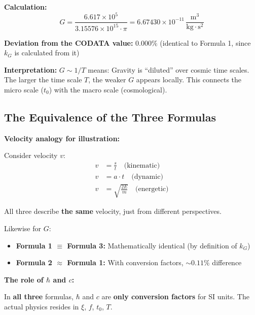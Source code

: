 	\textbf{Calculation:}
	\begin{equation}
		G = \frac{6.617 \times 10^5}{3.15576 \times 10^{15} \cdot \pi} = 6.67430 \times 10^{-11}\,\frac{\text{m}^3}{\text{kg} \cdot \text{s}^2}
	\end{equation}
	
	\textbf{Deviation from the CODATA value:} \(0.000\%\) (identical to Formula 1, since \(k_G\) is calculated from it)
	
	\textbf{Interpretation:} \(G \sim 1/T\) means: Gravity is \enquote{diluted} over cosmic time scales. The larger the time scale \(T\), the weaker \(G\) appears locally. This connects the micro scale (\(t_0\)) with the macro scale (cosmological).
	
	\subsection{The Equivalence of the Three Formulas}
	
	\textbf{Velocity analogy for illustration:}
	
	Consider velocity \(v\):
	\begin{align}
		v &= \frac{s}{t} \quad \text{(kinematic)} \\
		v &= a \cdot t \quad \text{(dynamic)} \\
		v &= \sqrt{\frac{2E}{m}} \quad \text{(energetic)}
	\end{align}
	
	All three describe \textbf{the same} velocity, just from different perspectives.
	
	Likewise for \(G\):
	\begin{itemize}
		\item \textbf{Formula 1 \(\equiv\) Formula 3:} Mathematically identical (by definition of \(k_G\))
		\item \textbf{Formula 2 \(\approx\) Formula 1:} With conversion factors, \(\sim0.11\%\) difference
	\end{itemize}
	
	\textbf{The role of \(\hbar\) and \(c\):}
	
	In \textbf{all three} formulas, \(\hbar\) and \(c\) are \textbf{only conversion factors} for SI units. The actual physics resides in \(\xi\), \(f\), \(t_0\), \(T\).
	
	\begin{table}[h!]
		\centering
		\caption{The three perspectives on \(G\) -- one constant, three viewpoints.}
	\end{table}
	
